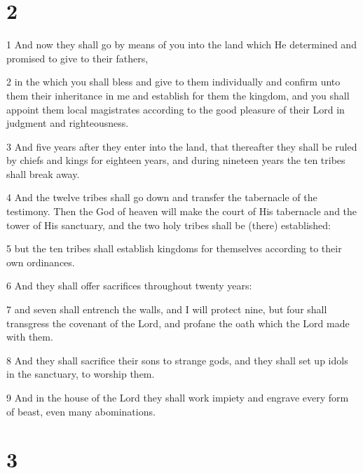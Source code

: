 \chapter{2}

\par 1 And now they shall go by means of you into the land which He determined and promised to give to their fathers,
\par 2 in the which you shall bless and give to them individually and confirm unto them their inheritance in me and establish for them the kingdom, and you shall appoint them local magistrates according to the good pleasure of their Lord in judgment and righteousness.
\par 3 And five years after they enter into the land, that thereafter they shall be ruled by chiefs and kings for eighteen years, and during nineteen years the ten tribes shall break away.
\par 4 And the twelve tribes shall go down and transfer the tabernacle of the testimony. Then the God of heaven will make the court of His tabernacle and the tower of His sanctuary, and the two holy tribes shall be (there) established:
\par 5 but the ten tribes shall establish kingdoms for themselves according to their own ordinances.
\par 6 And they shall offer sacrifices throughout twenty years:
\par 7 and seven shall entrench the walls, and I will protect nine, but four shall transgress the covenant of the Lord, and profane the oath which the Lord made with them.
\par 8 And they shall sacrifice their sons to strange gods, and they shall set up idols in the sanctuary, to worship them.
\par 9 And in the house of the Lord they shall work impiety and engrave every form of beast, even many abominations.

\chapter{3}

